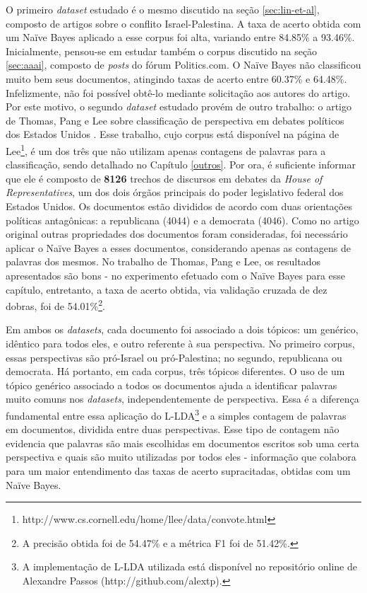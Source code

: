 O primeiro \emph{dataset} estudado é o mesmo discutido na seção \ref{sec:lin-et-al}, composto de artigos sobre o conflito Israel-Palestina. A taxa de acerto obtida com um Naïve Bayes aplicado a esse corpus foi alta, variando entre 84.85\% a 93.46\%. Inicialmente, pensou-se em estudar também o corpus discutido na seção \ref{sec:aaai}, composto de \emph{posts} do fórum Politics.com. O Naïve Bayes não classificou muito bem seus documentos,  atingindo taxas de acerto entre 60.37\% e 64.48\%. Infelizmente, não foi possível obtê-lo mediante solicitação aos autores do artigo. Por este motivo, o segundo \emph{dataset} estudado provém de outro trabalho: o artigo de Thomas, Pang e Lee sobre classificação de perspectiva em debates políticos dos Estados Unidos \cite{get-out-the-vote}. Esse trabalho, cujo corpus está disponível na página de Lee\footnote{http://www.cs.cornell.edu/home/llee/data/convote.html}, é um dos três que não utilizam apenas contagens de palavras para a classificação, sendo detalhado no Capítulo \ref{outros}. Por ora, é suficiente informar que ele é composto de \textbf{8126} trechos de discursos em debates da \emph{House of Representatives}, um dos dois órgãos principais do poder legislativo federal dos Estados Unidos. Os documentos estão divididos de acordo com duas orientações políticas antagônicas: a republicana  (4044) e a democrata (4046). Como no artigo original outras propriedades dos documentos foram consideradas, foi necessário aplicar o Naïve Bayes a esses documentos, considerando apenas as contagens de palavras dos mesmos. No trabalho de Thomas, Pang e Lee, os resultados apresentados são bons - no experimento efetuado com o Naïve Bayes para esse capítulo, entretanto, a taxa de acerto obtida, via validação cruzada de dez dobras, foi de 54.01\%\footnote{A precisão obtida foi de 54.47\% e a métrica F1 foi de 51.42\%.}.  


Em ambos os \emph{datasets}, cada documento foi associado a dois tópicos: um genérico, idêntico para todos eles, e outro referente à sua perspectiva. No primeiro corpus, essas perspectivas são pró-Israel ou pró-Palestina; no segundo, republicana ou democrata. Há portanto, em cada corpus, três tópicos diferentes. O uso de um tópico genérico associado a todos os documentos ajuda a identificar palavras muito comuns nos \emph{datasets}, independentemente de perspectiva. Essa é a diferença fundamental entre essa aplicação do L-LDA\footnote{A implementação de L-LDA utilizada está disponível no repositório online de Alexandre Passos (http://github.com/alextp).} e a simples contagem de palavras em documentos, dividida entre duas perspectivas. Esse tipo de contagem não evidencia que palavras são mais escolhidas em documentos escritos sob uma certa perspectiva e quais são muito utilizadas por todos eles - informação que colabora para um maior entendimento das taxas de acerto supracitadas, obtidas com um Naïve Bayes. 

